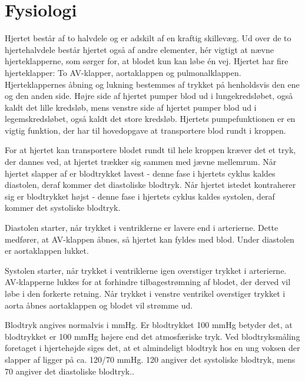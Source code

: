 \section{Fysiologi}

Hjertet består af to halvdele og er adskilt af en kraftig skillevæg. Ud over de to hjertehalvdele består hjertet også af andre elementer, hér vigtigt at nævne hjerteklapperne, som sørger for, at blodet kun kan løbe én vej. Hjertet har fire hjerteklapper: To AV-klapper, aortaklappen og pulmonalklappen. Hjerteklappernes åbning og lukning bestemmes af trykket på henholdsvis den ene og den anden side. Højre side af hjertet pumper blod ud i lungekredsløbet, også kaldt det lille kredsløb, mens venstre side af hjertet pumper blod ud i legemskredsløbet, også kaldt det store kredsløb. Hjertets pumpefunktionen er en vigtig funktion, der har til hovedopgave at transportere blod rundt i kroppen.

\vspace{0.125 cm}
For at hjertet kan transportere blodet rundt til hele kroppen kræver det et tryk, der dannes ved, at hjertet trækker sig sammen med jævne mellemrum. Når hjertet slapper af er blodtrykket lavest - denne fase i hjertets cyklus kaldes diastolen, deraf kommer det diastoliske blodtryk. Når hjertet istedet kontraherer sig er blodtrykket højst - denne fase i hjertets cyklus kaldes systolen, deraf kommer det systoliske blodtryk.

\vspace{0.125 cm}
Diastolen starter, når trykket i ventriklerne er lavere end i arterierne. Dette medfører, at AV-klappen åbnes, så hjertet kan fyldes med blod. Under diastolen er aortaklappen lukket.

\vspace{0.125 cm}
Systolen starter, når trykket i ventriklerne igen overstiger trykket i arterierne. AV-klapperne lukkes for at forhindre tilbagestrømning af blodet, der derved vil løbe i den forkerte retning. Når trykket i venstre ventrikel overstiger trykket i aorta åbnes aortaklappen og blodet vil strømme ud. 

\vspace{0.1 cm}
Blodtryk angives normalvis i mmHg. Er blodtrykket 100 mmHg betyder det, at blodtrykket er 100 mmHg højere end det atmosfæriske tryk. Ved blodtryksmåling foretaget i hjertehøjde siges det, at et almindeligt blodtryk hos en ung voksen der slapper af ligger på ca. 120/70 mmHg. 120 angiver det systoliske blodtryk, mens 70 angiver det diastoliske blodtryk..